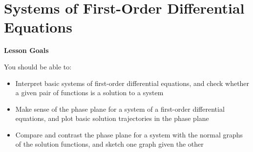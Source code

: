 \documentclass[main]{subfiles}
\begin{document}
\ifSubfilesClassLoaded{%
  \chaptermark{\chapterthree}
}{}

\section{Systems of First-Order Differential Equations} \label{ws3-8}

\begin{framed}
\centerline{\textbf{Lesson Goals}}

You should be able to:
\begin{itemize}
\item Interpret basic systems of first-order differential equations, and check whether a given pair of functions is a solution to a system
\item Make sense of the phase plane for a system of a first-order differential equations, and plot basic solution trajectories in the phase plane
\item Compare and contrast the phase plane for a system with the normal graphs of the solution functions, and sketch one graph given the other
\end{itemize}
\end{framed}
\end{document}
